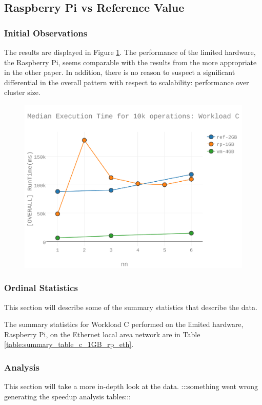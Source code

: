 \subsection{Raspberry Pi vs Reference Value}
\subsubsection{Initial Observations}
The results are displayed in Figure \ref{figures-wlc_fig6}.  The performance of the limited hardware, the Raspberry Pi, seems comparable with the results from the more appropriate in the other paper. In addition, there is no reason to suspect a significant differential in the overall pattern with respect to scalability: performance over cluster size. \begin{figure}[h]
\includegraphics[width=5.5in]{Figures/figures-wlc_fig6.pdf}
\caption{}
\label{figures-wlc_fig6}
\end{figure}



\subsubsection{Ordinal Statistics}
This section will describe some of the summary statistics that describe the data.  

The summary statistics for Workload C performed on the limited hardware, Raspberry Pi, on the Ethernet local area network are in Table \ref{table:summary_table_c_1GB_rp_eth}.



\subsubsection{Analysis}
This section will take a more in-depth look at the data.
:::something went wrong generating the speedup analysis tables:::


